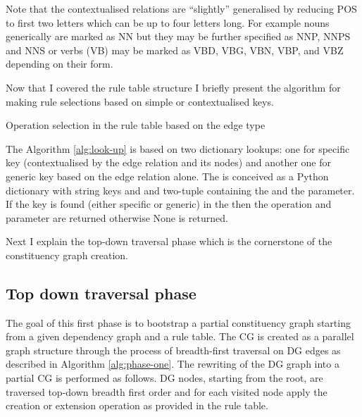 Note that the contextualised relations are ``slightly'' generalised by reducing POS to first two letters which can be up to four letters long. For example nouns generically are marked as NN but they may be further specified as NNP, NNPS and NNS or verbs (VB) may be marked as VBD, VBG, VBN, VBP, and VBZ depending on their form. 

Now that I covered the rule table structure I briefly present the algorithm for making rule selections based on simple or contextualised keys.  

\begin{algorithm}[!ht]
    \Input{ \rt, \edge}
    \Output{ \rrule}
    \caption{Operation selection in the rule table based on the edge type}
    \label{alg:look-up}
\end{algorithm}

The Algorithm \ref{alg:look-up} is based on two dictionary lookups: one for specific key (contextualised by the edge relation and its nodes) and another one for generic key based on the edge relation alone. The \rt is conceived as a Python dictionary with string keys and and two-tuple containing the \operation and the \elementType parameter. If the key is found (either specific or generic) in the \rt then the operation and parameter are returned otherwise None is returned. 

Next I explain the top-down traversal phase which is the cornerstone of the constituency graph creation. 

\subsection{Top down traversal phase}
\label{sec:first-phase}
The goal of this first phase is to bootstrap a partial constituency graph starting from a given dependency graph and a rule table. The CG is created as a parallel graph structure through the process of breadth-first traversal on DG edges as described in Algorithm \ref{alg:phase-one}. The rewriting of the DG graph into a partial CG is performed as follows. DG nodes, starting from the root, are traversed top-down breadth first order and for each visited node apply the creation or extension operation as provided in the rule table. 


